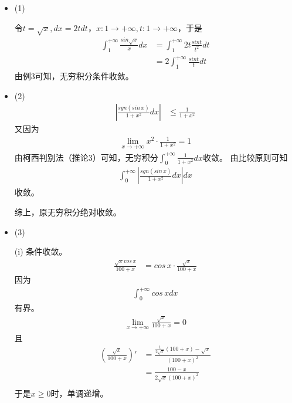 \documentclass{article}
\begin{document}
\begin{itemize}
  \item (1)

        令$t = \sqrt{x}, dx = 2tdt$，$x: 1 \to +\infty, t: 1 \to +\infty$，于是
        \begin{align*}
          \int_{1}^{+\infty} \frac{sin \sqrt{x}}{x} dx
           & = \int_{1}^{+\infty} 2t \frac{sin t}{t^2} dt \\
           & = 2 \int_{1}^{+\infty} \frac{sin t}{t} dt
        \end{align*}
        由例3可知，无穷积分条件收敛。

  \item (2)
        \begin{align*}
          \left| \frac{sgn(sin\, x)}{1 + x^2} dx \right|
           & \leq \frac{1}{1 + x^2}
        \end{align*}
        又因为
        \begin{align*}
          \lim\limits_{x \to +\infty} x^2 \cdot \frac{1}{1 + x^2} = 1
        \end{align*}
        由柯西判别法（推论3）可知，无穷积分$\int_{0}^{+\infty} \frac{1}{1 + x^2} dx$收敛。
        由比较原则可知
        \begin{align*}
          \int_{0}^{+\infty} \left| \frac{sgn(sin\, x)}{1 + x^2} dx \right| dx
        \end{align*}
        收敛。

        综上，原无穷积分绝对收敛。

  \item (3)

        (i) 条件收敛。
        \begin{align*}
          \frac{\sqrt{x} cos\, x}{100 + x}
           & = cos\, x \cdot \frac{\sqrt{x}}{100 + x}
        \end{align*}
        因为
        \begin{align*}
          \int_{0}^{+\infty} cos\, x dx
        \end{align*}
        有界。
        \begin{align*}
          \lim\limits_{x \to +\infty} \frac{\sqrt{x}}{100 + x} = 0
        \end{align*}
        且
        \begin{align*}
          (\frac{\sqrt{x}}{100 + x})'
           & = \frac{\frac{1}{2\sqrt{x}}(100 + x) - \sqrt{x}}{(100 + x)^2} \\
           & = \frac{100 - x}{2\sqrt{x}(100 + x)^2}                        \\
        \end{align*}
        于是$x \geq 0$时，单调递增。


\end{itemize}
\end{document}
